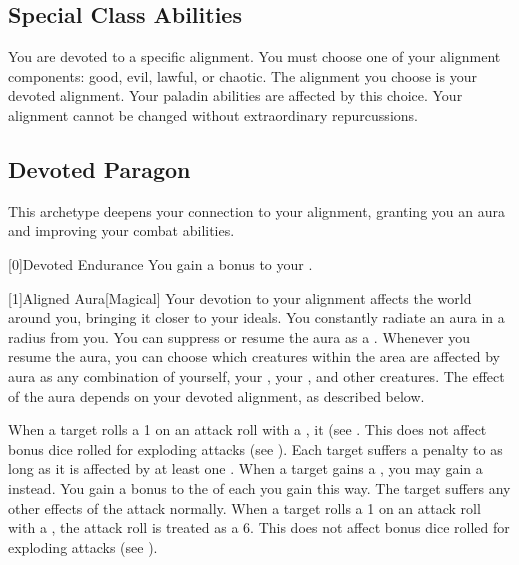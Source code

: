     \subsection{Special Class Abilities}

        You are devoted to a specific alignment.
        You must choose one of your alignment components: good, evil, lawful, or chaotic.
        The alignment you choose is your devoted alignment.
        Your paladin abilities are affected by this choice.
        Your alignment cannot be changed without extraordinary repurcussions.

    \newpage
    \subsection{Devoted Paragon}
        This archetype deepens your connection to your alignment, granting you an aura and improving your combat abilities.

        [0]{Devoted Endurance} You gain a  bonus to your .

        [1]{Aligned Aura}[Magical]
        Your devotion to your alignment affects the world around you, bringing it closer to your ideals.
        You constantly radiate an aura in a \areamed radius  from you.
        You can suppress or resume the aura as a .
        Whenever you resume the aura, you can choose which creatures within the area are affected by aura as any combination of yourself, your , your , and other creatures.
        The effect of the aura depends on your devoted alignment, as described below.

         When a target rolls a 1 on an attack roll with a , it  (see .
        This does not affect bonus dice rolled for exploding attacks (see ).
         Each target suffers a  penalty to  as long as it is affected by at least one .
         When a target gains a , you may gain a  instead.
        You gain a  bonus to the  of each  you gain this way.
        The target suffers any other effects of the attack normally.
         When a target rolls a 1 on an attack roll with a , the attack roll is treated as a 6.
        This does not affect bonus dice rolled for exploding attacks (see ).


